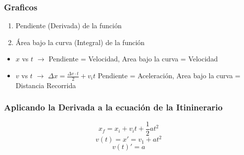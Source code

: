 \documentclass[11pt]{article}
\begin{document}
        \subsubsection{Graficos}
        \begin{enumerate}
            \item Pendiente (Derivada) de la función
            \item Área bajo la curva (Integral) de la función
        \end{enumerate}
            \begin{itemize}
                \item $x$ vs $t$ $\rightarrow$ Pendiente = Velocidad, Area bajo la curva = Velocidad
                \item $v$ vs $t$ $\rightarrow$ $\Delta{x}=\frac{\Delta{v} \cdot t}{2}+v_i t$ Pendiente = Aceleración, Area bajo la curva = Distancia Recorrida
            \end{itemize}

        \subsubsection{Aplicando la Derivada a la ecuación de la Itininerario}
            \[x_f=x_i+v_i t+\frac{1}{2}at^2 \]
            \[v(t)=x'=v_1+at^2 \]
            \[v(t)'=a \]

            
\end{document}
